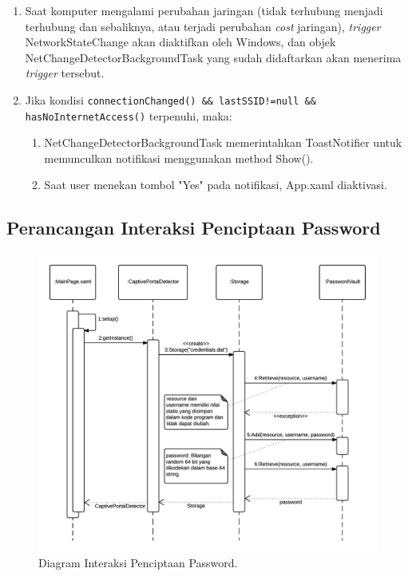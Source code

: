 \begin{enumerate}
    \item{Saat komputer mengalami perubahan jaringan (tidak terhubung menjadi terhubung dan sebaliknya, atau terjadi perubahan \textit{cost} jaringan), \textit{trigger} NetworkStateChange akan diaktifkan oleh Windows, dan objek NetChangeDetectorBackgroundTask yang sudah didaftarkan akan menerima \textit{trigger} tersebut.}
    \item{Jika kondisi \texttt{connectionChanged() \&\& lastSSID!=null \&\& hasNoInternetAccess()} terpenuhi, maka:}
    \begin{enumerate}
        \item{NetChangeDetectorBackgroundTask memerintahkan ToastNotifier untuk memunculkan notifikasi menggunakan method Show().}
        \item{Saat user menekan tombol "Yes" pada notifikasi, App.xaml diaktivasi.}
    \end{enumerate}
\end{enumerate}

\subsection{Perancangan Interaksi Penciptaan Password}
\label{subsec:perancangan_interaksi_penciptaan_password}

\begin{figure}[!htb]
    \centering
    \includegraphics[scale=0.9]{Gambar/SequenceDiagramPasswordGeneration.png}
    \caption[Diagram Interaksi Penciptaan Password.]{Diagram Interaksi Penciptaan Password.} 
    \label{fig:PasswordGenerationSequenceDiagram}
\end{figure}

